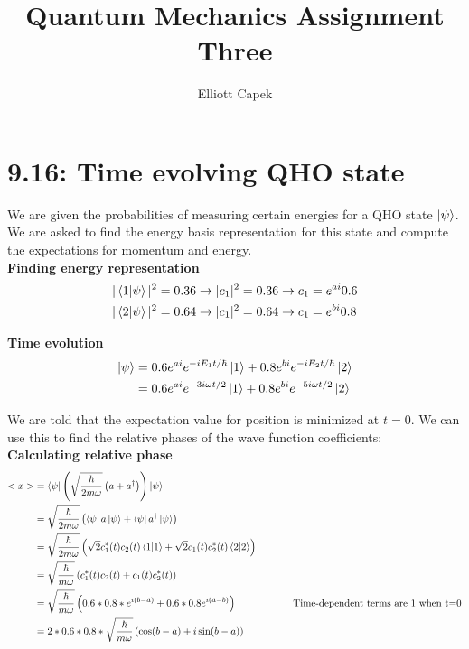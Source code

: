 \documentclass[10pt]{article} %
\title{Quantum Mechanics Assignment Three}
\author{Elliott Capek}
\begin{document}
\maketitle{}

\section{9.16: Time evolving QHO state}
We are given the probabilities of measuring certain energies for a QHO state $\ket{\psi}$. We
are asked to find the energy basis representation for this state and compute the expectations for
momentum and energy.\\

\textbf{Finding energy representation}
\begin{align*}
  |\bra{1}\ket{\psi}|^2 = 0.36 \rightarrow |c_1|^2 &= 0.36 \rightarrow c_1 = e^{ai}0.6\\
  |\bra{2}\ket{\psi}|^2 = 0.64 \rightarrow |c_1|^2 &= 0.64 \rightarrow c_1 = e^{bi}0.8\\
\end{align*}

\textbf{Time evolution}
\begin{align*}
  \ket{\psi} &= 0.6e^{ai}e^{-iE_1t/\hbar}\ket{1} + 0.8e^{bi}e^{-iE_2t/\hbar}\ket{2}\\
  &= 0.6e^{ai}e^{-3i\omega t/2}\ket{1} + 0.8e^{bi}e^{-5i\omega t/2}\ket{2}\\
\end{align*}

We are told that the expectation value for position is minimized at $t=0$. We can use this to find
the relative phases of the wave function coefficients:\\

\textbf{Calculating relative phase}
\begin{align*}
  <x> &= \bra{\psi}\left(\sqrt{\frac{\hbar}{2m\omega}}
  \left(a + a^\dagger\right)\right)\ket{\psi}\\
  &= \sqrt{\frac{\hbar}{2m\omega}}\left(\bra{\psi}a\ket{\psi}
  + \bra{\psi}a^\dagger\ket{\psi}\right)\\
  &= \sqrt{\frac{\hbar}{2m\omega}}\left(\sqrt{2}c_1^*(t)c_2(t)\bra{1}\ket{1}
  + \sqrt{2}c_1(t)c_2^*(t)\bra{2}\ket{2}\right)\\
  &= \sqrt{\frac{\hbar}{m\omega}}\left(c_1^*(t)c_2(t) + c_1(t)c_2^*(t)\right)\\
  &= \sqrt{\frac{\hbar}{m\omega}}\left(0.6*0.8*e^{i(b-a)} + 0.6*0.8e^{i(a-b)}\right)
  \hspace{2cm}\mbox{Time-dependent terms are 1 when t=0}\\
  &= 2*0.6*0.8*\sqrt{\frac{\hbar}{m\omega}}\left(\cos(b-a) + i\sin(b-a)\right)\\
\end{align*}
\end{document}
